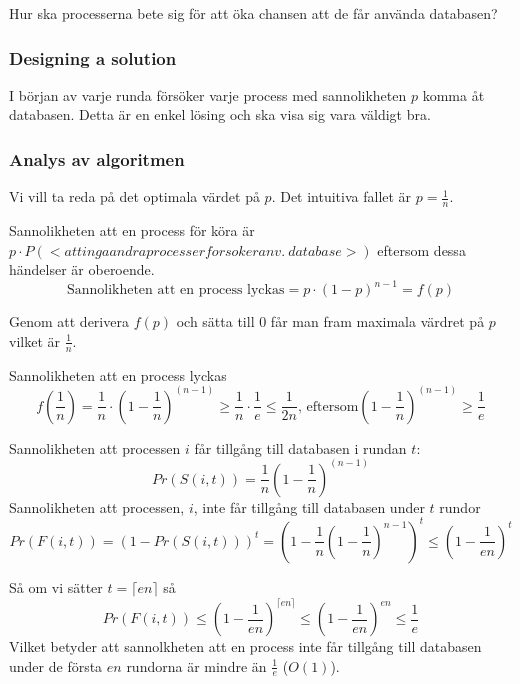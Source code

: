 \documentclass[a4paper]{report}
\begin{document}
Hur ska processerna bete sig för att öka chansen att de får använda databasen?
\subsubsection{Designing a solution}
I början av varje runda försöker varje process med sannolikheten $p$ komma åt
databasen. Detta är en enkel lösing och ska visa sig vara väldigt bra.

\subsubsection{Analys av algoritmen}
Vi vill ta reda på det optimala värdet på $p$. Det intuitiva fallet är $p =
\frac{1}{n}$.

Sannolikheten att en process för köra är $p \cdot P(<att inga andra processer
forsoker anv.\ database>)$ eftersom dessa händelser är oberoende.
\begin{equation}
	\mbox{Sannolikheten att en process lyckas} = p \cdot (1 - p)^{n - 1} = f(p)
\end{equation}

Genom att derivera $f(p)$ och sätta till $0$ får man fram maximala värdret på
$p$ vilket är $\frac{1}{n}$.

Sannolikheten att en process lyckas
\begin{equation}
	f(\frac{1}{n}) = \frac{1}{n} \cdot (1 - \frac{1}{n})^{(n-1)} \geq
	\frac{1}{n} \cdot \frac{1}{e} \leq \frac{1}{2n}\mbox{, eftersom} (1 -
	\frac{1}{n})^{(n-1)} \geq \frac{1}{e}
\end{equation}

Sannolikheten att processen $i$ får tillgång till databasen i rundan $t$:
\begin{equation}
	Pr(S(i,t)) = \frac{1}{n}(1 - \frac{1}{n})^{(n-1)}
\end{equation}
Sannolikheten att processen, $i$, inte får tillgång till databasen under $t$
rundor
\begin{equation}
	Pr(F(i,t)) = (1 - Pr(S(i,t)))^t = (1 - \frac{1}{n}(1 -
	\frac{1}{n})^{n-1})^t \leq (1 - \frac{1}{en})^t
\end{equation}

Så om vi sätter $t = \lceil{}en\rceil$ så
\begin{equation}
	Pr(F(i,t)) \leq (1 - \frac{1}{en})^{\lceil{}en\rceil} \leq (1 -
	\frac{1}{en})^{en} \leq \frac{1}{e}
\end{equation}
Vilket betyder att sannolkheten att en process inte får tillgång till databasen
under de första $en$ rundorna är mindre än $\frac{1}{e}$ ($O(1)$).
\end{document}
